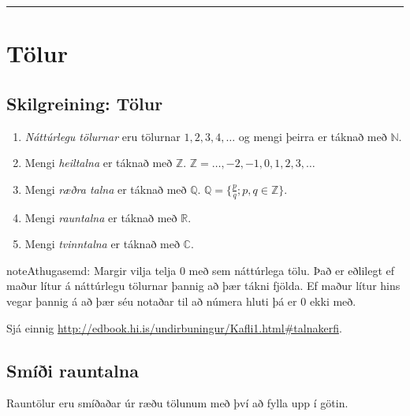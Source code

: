 \documentclass[b5paper,10pt,icelandic]{sphinxmanual}
\begin{document}
\bigskip\hrule{}\bigskip



\section{Tölur}
\label{kafli01:tolur}

\subsection{Skilgreining: Tölur}
\label{kafli01:index-0}\label{kafli01:skilgreining-tolur}\begin{enumerate}
\item {} 
\textit{Náttúrlegu tölurnar} eru tölurnar \(1, 2, 3, 4, \ldots\) og
mengi þeirra er táknað með \(\mathbb{N}\).

\item {} 
Mengi \textit{heiltalna} er táknað með \(\mathbb{Z}\).
\(\mathbb{Z}= \ldots,-2,-1,0,1,2,3,\ldots\)

\item {} 
Mengi \textit{ræðra talna} er táknað með \(\mathbb{Q}\).
\(\mathbb{Q}= \{ \frac pq ; p,q \in \mathbb{Z}\}\).

\item {} 
Mengi \textit{rauntalna} er táknað með \(\mathbb{R}\).

\item {} 
Mengi \textit{tvinntalna} er táknað með \(\mathbb{C}\).

\end{enumerate}

\begin{notice}{note}{Athugasemd:}
Margir vilja telja \(0\) með sem náttúrlega tölu. Það
er eðlilegt ef maður lítur á náttúrlegu tölurnar þannig að þær tákni
fjölda. Ef maður lítur hins vegar þannig á að þær séu notaðar til að
númera hluti þá er 0 ekki með.
\end{notice}

Sjá einnig \href{http://edbook.hi.is/undirbuningur/Kafli1.html\#talnakerfi}{http://edbook.hi.is/undirbuningur/Kafli1.html\#talnakerfi}.


\subsection{Smíði rauntalna}
\label{kafli01:smii-rauntalna}
Rauntölur eru smíðaðar úr ræðu tölunum með því að
fylla upp í götin.
\end{document}
